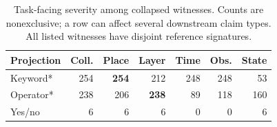 \begin{table}[t]
\centering
\caption{Task-facing severity among collapsed witnesses.  Counts are nonexclusive; a row can affect several downstream claim types.  All listed witnesses have disjoint reference signatures.}
\label{tab:claim-severity}
\footnotesize
\setlength{\tabcolsep}{3.0pt}
\renewcommand{\arraystretch}{1.03}
\begin{tabular}{@{}lrrrrrr@{}}
\toprule
Projection & Coll. & Place & Layer & Time & Obs. & State \\
\midrule
Keyword* & 254 & \textbf{254} & 212 & 248 & 248 & 53 \\
Operator* & 238 & 206 & \textbf{238} & 89 & 118 & 160 \\
Yes/no & 6 & 6 & 6 & 0 & 0 & 6 \\
\bottomrule
\end{tabular}
\end{table}
